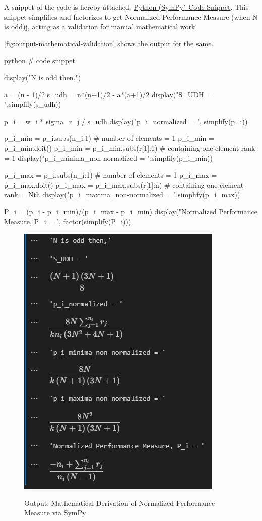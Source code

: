 \documentclass[a4paper,fleqn,review]{cas-sc}
\begin{document}
A snippet of the code is hereby attached: \hyperref[code:snippet_odd_performance_measure]{Python (SymPy) Code Snippet}. This snippet simplifies and factorizes to get Normalized Performance Measure (when N is odd)j, acting as a validation for manual mathematical work.

\autoref{fig:output-mathematical-validation} shows the output for the same.
 	
\begin{mintedbox}{python}
	# code snippet
	
	display("N is odd then,")
	
	a = (n - 1)/2
	s_udh = n*(n+1)/2 - a*(a+1)/2
	display("S_UDH = ",simplify(s_udh))
	
	p_i = w_i * sigma_r_j / s_udh
	display("p_i_normalized = ", simplify(p_i))
	
	p_i_min = p_i.subs({n_i:1}) # number of elements = 1
	p_i_min = p_i_min.doit()
	p_i_min = p_i_min.subs({r[1]:1}) # containing one element rank = 1
	display("p_i_minima_non-normalized = ",simplify(p_i_min))
	
	p_i_max = p_i.subs({n_i:1}) # number of elements = 1
	p_i_max = p_i_max.doit()
	p_i_max = p_i_max.subs({r[1]:n}) # containing one element rank = Nth
	display("p_i_maxima_non-normalized = ",simplify(p_i_max))
	
	P_i = (p_i - p_i_min)/(p_i_max - p_i_min)
	display("Normalized Performance Measure, P_i = ", factor(simplify(P_i)))
\end{mintedbox}
\label{code:snippet_odd_performance_measure}


\begin{figure}
	\caption{Output: Mathematical Derivation of Normalized Performance Measure via SymPy}
	\centering
	\includegraphics [scale=1]{output-mathematical-validation.png}
	\label{fig:output-mathematical-validation}
\end{figure}
\end{document}
